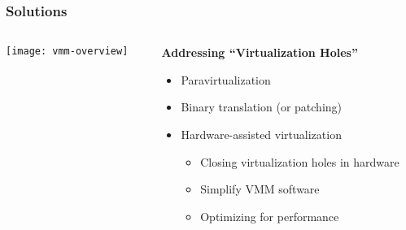 \begin{frame}[plain]
	\frametitle{Solutions }
	
	
	
	\begin{columns}
		
		\begin{column}{.3\textwidth}
			
			\texttt{[image: vmm-overview]}
			
		\end{column}
		
		\begin{column}{.7\textwidth}
			
			\textbf{Addressing  “Virtualization Holes”}
			
			\begin{itemize}
				\item Paravirtualization
				\item Binary translation (or patching)
				\item Hardware-assisted virtualization
				\begin{itemize}
								
				\item Closing virtualization holes in hardware
				\item Simplify VMM software
				\item Optimizing for performance
				\end{itemize} 
			\end{itemize} 
			
		\end{column}
		
		
	\end{columns}
	
	
\end{frame}


